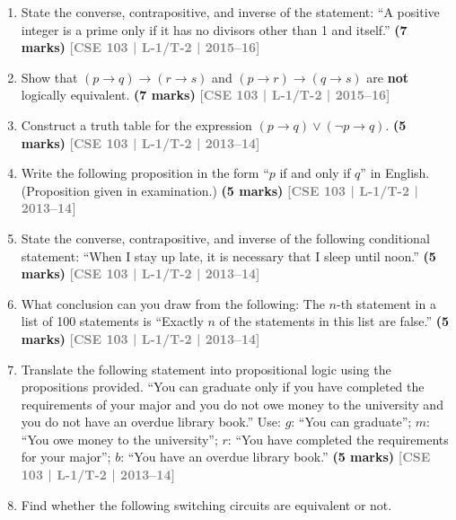 \documentclass[12pt,a3paper]{article}
\newcommand{\yr}[1]{\hfill\textcolor{gray}{\small\textbf{[#1]}}}
\newcommand{\mk}[1]{\textcolor{orange!70!black}{\small\textbf{(#1 marks)}}}
\begin{document}
\begin{enumerate}
\item State the converse, contrapositive, and inverse of the statement: ``A positive integer is a prime only if it has no divisors other than 1 and itself.''
\mk{7} \yr{CSE 103 | L-1/T-2 | 2015--16}

\item Show that $(p \to q) \to (r \to s)$ and $(p \to r) \to (q \to s)$ are \textbf{not} logically equivalent.
\mk{7} \yr{CSE 103 | L-1/T-2 | 2015--16}

\item Construct a truth table for the expression $(p \to q) \lor (\lnot p \to q)$.
\mk{5} \yr{CSE 103 | L-1/T-2 | 2013--14}

\item Write the following proposition in the form ``$p$ if and only if $q$'' in English. (Proposition given in examination.)
\mk{5} \yr{CSE 103 | L-1/T-2 | 2013--14}

\item State the converse, contrapositive, and inverse of the following conditional statement: ``When I stay up late, it is necessary that I sleep until noon.''
\mk{5} \yr{CSE 103 | L-1/T-2 | 2013--14}

\item What conclusion can you draw from the following: The $n$-th statement in a list of 100 statements is ``Exactly $n$ of the statements in this list are false.''
\mk{5} \yr{CSE 103 | L-1/T-2 | 2013--14}

\item Translate the following statement into propositional logic using the propositions provided. ``You can graduate only if you have completed the requirements of your major and you do not owe money to the university and you do not have an overdue library book.'' Use: $g$: ``You can graduate''; $m$: ``You owe money to the university''; $r$: ``You have completed the requirements for your major''; $b$: ``You have an overdue library book.''
\mk{5} \yr{CSE 103 | L-1/T-2 | 2013--14}  

\item Find whether the following switching circuits are equivalent or not.
    
    \noindent
    \begin{minipage}{\textwidth}
    \raggedright
\end{minipage}
\end{enumerate}
\end{document}
